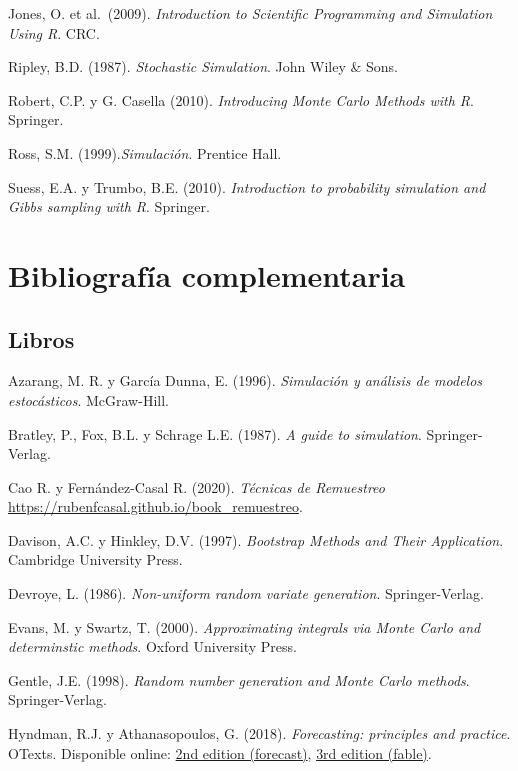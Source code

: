 \documentclass[
]{book}
\theoremstyle{break}
\theoremstyle{definition}
\theoremstyle{definition}
\theoremstyle{definition}
\theoremstyle{definition}
\theoremstyle{remark}
\begin{document}
Jones, O. et al.~(2009). \emph{Introduction to Scientific Programming and Simulation Using R}. CRC.

Ripley, B.D. (1987). \emph{Stochastic Simulation}. John Wiley \& Sons.

Robert, C.P. y G. Casella (2010). \emph{Introducing Monte Carlo Methods with R}. Springer.

Ross, S.M. (1999).\emph{Simulación}. Prentice Hall.

Suess, E.A. y Trumbo, B.E. (2010). \emph{Introduction to probability simulation and Gibbs sampling with R}. Springer.

\hypertarget{bibliografuxeda-complementaria}{%
\section*{Bibliografía complementaria}\label{bibliografuxeda-complementaria}}

\hypertarget{libros}{%
\subsection*{Libros}\label{libros}}

Azarang, M. R. y García Dunna, E. (1996). \emph{Simulación y análisis de modelos estocásticos}. McGraw-Hill.

Bratley, P., Fox, B.L. y Schrage L.E. (1987). \emph{A guide to simulation}. Springer-Verlag.

Cao R. y Fernández-Casal R. (2020). \emph{Técnicas de Remuestreo} \url{https://rubenfcasal.github.io/book_remuestreo}.

Davison, A.C. y Hinkley, D.V. (1997). \emph{Bootstrap Methods and Their Application}. Cambridge University Press.

Devroye, L. (1986). \emph{Non-uniform random variate generation}. Springer-Verlag.

Evans, M. y Swartz, T. (2000). \emph{Approximating integrals via Monte Carlo and determinstic methods}. Oxford University Press.

Gentle, J.E. (1998). \emph{Random number generation and Monte Carlo methods}. Springer-Verlag.

Hyndman, R.J. y Athanasopoulos, G. (2018). \emph{Forecasting: principles and practice}. OTexts.
Disponible online: \href{https://otexts.com/fpp2}{2nd edition (forecast)}, \href{https://otexts.com/fpp3}{3rd edition (fable)}.
\end{document}
